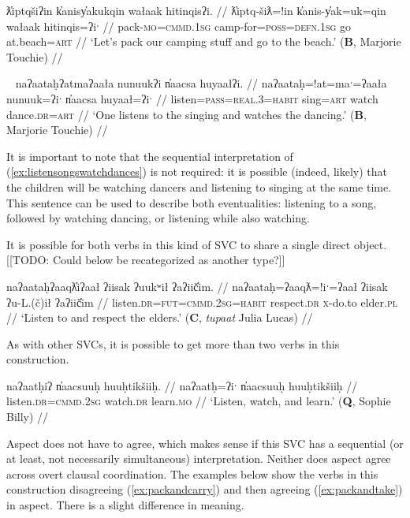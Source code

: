 \ex \label{ex:packgotobeach}
\begingl
\glpreamble ƛ̓iptqšiʔin k̓anisy̓akukqin wałaak hitinqisʔi. //
\gla ƛ̓iptq-šiƛ=!in k̓anis-y̓ak=uk=qin wałaak hitinqis=ʔiˑ //
\glb pack-\textsc{mo}=\textsc{cmmd.1sg} camp-for=\textsc{poss}=\textsc{defn.1sg} go at.beach=\textsc{art} //
\glft `Let's pack our camping stuff and go to the beach.' (\textbf{B}, Marjorie Touchie) //
\endgl
\xe

\ex~ \label{ex:listensongswatchdances}
\begingl
\glpreamble naʔaataḥʔatmaʔaała nunuukʔi n̓aacsa huyaałʔi. //
\gla naʔaataḥ=!at=maˑ=ʔaała nunuuk=ʔiˑ n̓aacsa huyaał=ʔiˑ //
\glb listen=\textsc{pass}=\textsc{real.3}=\textsc{habit} sing=\textsc{art} watch dance.\textsc{dr}=\textsc{art} //
\glft `One listens to the singing and watches the dancing.' (\textbf{B}, Marjorie Touchie) //
\endgl
\xe

It is important to note that the sequential interpretation of (\ref{ex:listensongswatchdances}) is not required: it is possible (indeed, likely) that the children will be watching dancers and listening to singing at the same time. This sentence can be used to describe both eventualities: listening to a song, followed by watching dancing, or listening while also watching.

It is possible for both verbs in this kind of SVC to share a single direct object. [[TODO: Could below be recategorized as another type?]]

\ex \label{ex:listenrespect}
\begingl
\glpreamble naʔaataḥʔaaqƛ̓iʔaał ʔiisak ʔuukʷił ʔaʔiič̓im. //
\gla naʔaataḥ=ʔaaqƛ=!iˑ=ʔaał ʔiisak ʔu-L.(č)ił ʔaʔiič̓im //
\glb listen.\textsc{dr}=\textsc{fut}=\textsc{cmmd.2sg}=\textsc{habit} respect.\textsc{dr} \textsc{x}-do.to elder.\textsc{pl} //
\glft `Listen to and respect the elders.' (\textbf{C}, \textit{tupaat} Julia Lucas) //
\endgl
\xe


As with other SVCs, it is possible to get more than two verbs in this construction.

\ex \label{ex:listenwtachlearn}
\begingl
\glpreamble naʔaatḥiʔ n̓aacsuuḥ huuḥtikšiiḥ. //
\gla naʔaatḥ=ʔiˑ n̓aacsuuḥ huuḥtikšiiḥ //
\glb listen.\textsc{dr}=\textsc{cmmd.2sg} watch.\textsc{dr} learn.\textsc{mo} //
\glft `Listen, watch, and learn.' (\textbf{Q}, Sophie Billy) //
\endgl
\xe

Aspect does not have to agree, which makes sense if this SVC has a sequential (or at least, not necessarily simultaneous) interpretation. Neither does aspect agree across overt clausal coordination. The examples below show the verbs in this construction disagreeing (\ref{ex:packandcarry}) and then agreeing (\ref{ex:packandtake}) in aspect. There is a slight difference in meaning.

